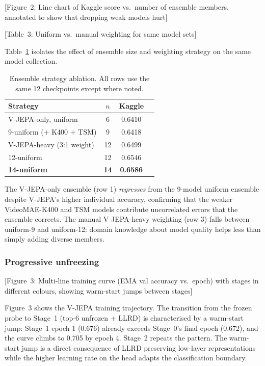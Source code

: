 \documentclass[10pt,twocolumn,letterpaper]{article}
\begin{document}
[Figure~2: Line chart of Kaggle score vs.\ number of ensemble members,
annotated to show that dropping weak models hurt]

[Table~3: Uniform vs.\ manual weighting for same model sets]

Table~\ref{tab:ensemble_ablation} isolates the effect of ensemble size
and weighting strategy on the same model collection.

\begin{table}[!t]
\centering
\caption{Ensemble strategy ablation. All rows use the same 12 checkpoints
  except where noted.}
\label{tab:ensemble_ablation}
\small
\setlength{\tabcolsep}{4pt}
\begin{tabular}{lccc}
\toprule
\textbf{Strategy} & \textbf{$n$} & \textbf{Kaggle}\\
\midrule
V-JEPA-only, uniform & 6 & 0.6410\\
9-uniform (+ K400 + TSM) & 9 & 0.6418\\
V-JEPA-heavy (3:1 weight) & 12 & 0.6499\\
12-uniform & 12 & 0.6546\\
\textbf{14-uniform} & \textbf{14} & \textbf{0.6586}\\
\bottomrule
\end{tabular}
\end{table}

The V-JEPA-only ensemble (row 1) \emph{regresses} from the 9-model
uniform ensemble despite V-JEPA's higher individual accuracy, confirming
that the weaker VideoMAE-K400 and TSM models contribute uncorrelated
errors that the ensemble corrects.  The manual V-JEPA-heavy weighting
(row 3) falls between uniform-9 and uniform-12: domain knowledge about
model quality helps less than simply adding diverse members.

\subsubsection{Progressive unfreezing}

[Figure~3: Multi-line training curve (EMA val accuracy vs.\ epoch) with
stages in different colours, showing warm-start jumps between stages]

Figure~3 shows the V-JEPA training trajectory.  The transition from the
frozen probe to Stage~1 (top-6 unfrozen + LLRD) is characterised by a
warm-start jump: Stage~1 epoch 1 (0.676) already exceeds Stage~0's final
epoch (0.672), and the curve climbs to 0.705 by epoch 4.  Stage~2 repeats
the pattern.  The warm-start jump is a direct consequence of LLRD
preserving low-layer representations while the higher learning rate on the
head adapts the classification boundary.
\end{document}
